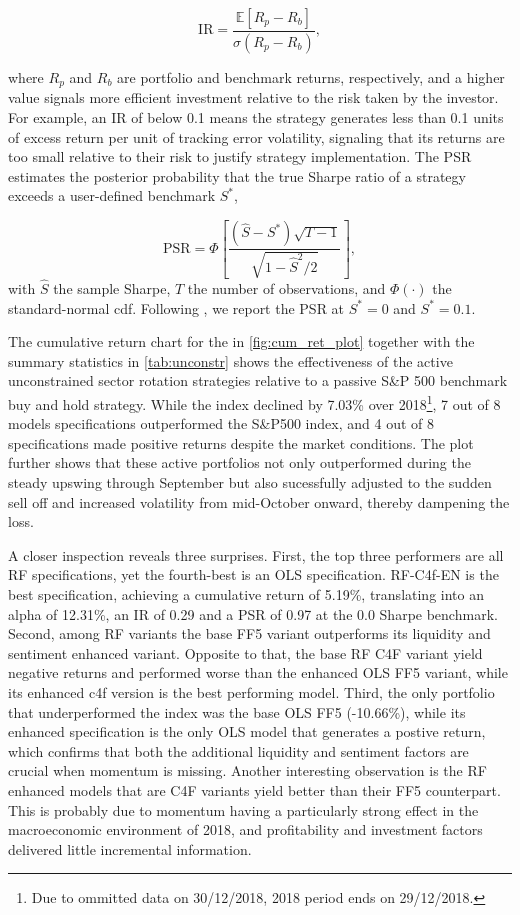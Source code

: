 \begin{equation}
\mathrm{IR}=\frac{\mathbb{E}\left[R_{p}-R_{b}\right]}{\sigma\left(R_{p}-R_{b}\right)},
\end{equation}

where $R_{p}$ and $R_{b}$ are portfolio and benchmark returns, respectively, and a higher value signals more efficient investment relative to the risk taken by the investor. For example, an IR of below 0.1 means the strategy generates less than 0.1 units of excess return per unit of tracking error volatility, signaling that its returns are too small relative to their risk to justify strategy implementation. The PSR estimates the posterior probability that the true Sharpe ratio of a strategy exceeds a user-defined benchmark $S^{*}$,

\begin{equation}
\mathrm{PSR}= \Phi\left[\frac{\left(\hat{S}-S^{*}\right)\sqrt{T-1}}{\sqrt{1-\hat{S}^{2}/2}}\right],
\end{equation}
with $\hat{S}$ the sample Sharpe, $T$ the number of observations, and $\Phi(\cdot)$ the standard-normal cdf. Following , we report the PSR at $S^{*}=0$ and $S^{*}=0.1$.


The cumulative return chart for the in \cref{fig:cum_ret_plot} together with the summary statistics in \cref{tab:unconstr} shows the effectiveness of the active unconstrained sector rotation strategies relative to a passive S\&P 500 benchmark buy and hold strategy. While the index declined by 7.03\% over 2018\footnote{Due to ommitted data on 30/12/2018, 2018 period ends on 29/12/2018.}, 7 out of 8 models specifications outperformed the S\&P500 index, and 4 out of 8 specifications made positive returns despite the market conditions. The plot further shows that these active portfolios not only outperformed during the steady upswing through September but also sucessfully adjusted to the sudden sell off and increased volatility from mid-October onward, thereby dampening the loss.

A closer inspection reveals three surprises. First, the top three performers are all RF specifications, yet the fourth-best is an OLS specification. RF-C4f-EN is the best specification, achieving a cumulative return of 5.19\%, translating into an alpha of 12.31\%, an IR of 0.29 and a PSR of 0.97 at the 0.0 Sharpe benchmark.  Second, among RF variants the base FF5 variant outperforms its liquidity and sentiment enhanced variant. Opposite to that, the base RF C4F variant yield negative returns and performed worse than the enhanced OLS FF5 variant, while its enhanced c4f version is the best performing model. Third,  the only portfolio that underperformed the index was the base OLS FF5 (-10.66\%), while its enhanced specification is the only OLS model that generates a postive return, which confirms that both the additional liquidity and sentiment factors are crucial when momentum is missing. Another interesting observation is the RF enhanced models that are C4F variants yield better than their FF5 counterpart. This is probably due to momentum having a particularly strong effect in the macroeconomic environment of 2018, and profitability and investment factors delivered little incremental information.

